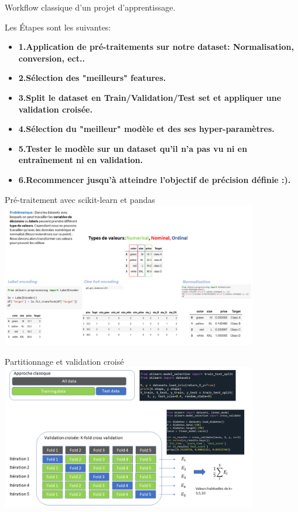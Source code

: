 \documentclass[9pt]{beamer}
\begin{document}
\begin{frame}{Workflow classique d'un projet d'apprentissage.}
\begin{block}{Les \'Etapes sont les suivantes:}
\begin{itemize}
    \item \textbf{1.Application de pré-traitements sur notre dataset: Normalisation, conversion, ect..}
    \item \textbf{2.Sélection des "meilleurs" features.}
    \item \textbf{3.Split le dataset en Train/Validation/Test set et appliquer une validation croisée.}
    \item \textbf{4.Sélection du "meilleur" modèle et des ses hyper-paramètres.}
    \item \textbf{5.Tester le modèle sur un dataset qu'il n'a pas vu ni en entraînement ni en validation.}
    \item \textbf{6.Recommencer jusqu'à atteindre l'objectif de précision définie :).}
\end{itemize}

\end{block}
    
\end{frame}




\begin{frame}{Pré-traitement avec scikit-learn et pandas}
\includegraphics[height=6.3cm]{Diapositive2.PNG}
\end{frame}

\begin{frame}{Partitionnage et validation croisé}
\includegraphics[height=6.3cm]{Diapositive3.PNG}
\end{frame}
\end{document}
